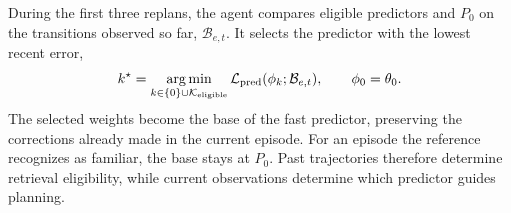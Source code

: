 During the first three replans, the agent compares eligible predictors and $P_0$ on the transitions observed so far, $\mathcal{B}_{e,t}$. It selects the predictor with the lowest recent error,
\begin{equation}
  k^\star=\operatorname*{arg\,min}_{k\in\{0\}\cup\mathcal{K}_{\mathrm{eligible}}}
  \mathcal{L}_{\mathrm{pred}}(\phi_k;\mathcal{B}_{e,t}),
  \qquad \phi_0=\theta_0.
  \label{eq:retrieval}
\end{equation}
The selected weights become the base of the fast predictor, preserving the corrections already made in the current episode. For an episode the reference recognizes as familiar, the base stays at $P_0$. Past trajectories therefore determine retrieval eligibility, while current observations determine which predictor guides planning.
